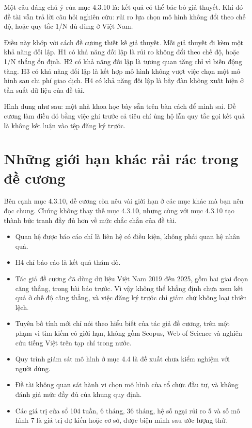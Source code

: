Một câu đáng chú ý của mục 4.3.10 là: kết quả có thể bác bỏ giả thuyết. Khi đó đề tài vẫn trả lời câu hỏi nghiên cứu: rủi ro lựa chọn mô hình không đổi theo chế độ, hoặc quy tắc 1/N đủ dùng ở Việt Nam.

Điều này khớp với cách đề cương thiết kế giả thuyết. Mỗi giả thuyết đi kèm một khả năng đối lập. H1 có khả năng đối lập là rủi ro không đổi theo chế độ, hoặc 1/N thắng ổn định. H2 có khả năng đối lập là tương quan tăng chỉ vì biến động tăng. H3 có khả năng đối lập là kết hợp mô hình không vượt việc chọn một mô hình sau chi phí giao dịch. H4 có khả năng đối lập là bầy đàn không xuất hiện ở tần suất dữ liệu của đề tài.

Hình dung như sau: một nhà khoa học bày sẵn trên bàn cách để mình sai. Đề cương làm điều đó bằng việc ghi trước cả tiêu chí ủng hộ lẫn quy tắc gọi kết quả là không kết luận vào tệp đăng ký trước.

\section{Những giới hạn khác rải rác trong đề cương}

Bên cạnh mục 4.3.10, đề cương còn nêu vài giới hạn ở các mục khác mà bạn nên đọc chung. Chúng không thay thế mục 4.3.10, nhưng cùng với mục 4.3.10 tạo thành bức tranh đầy đủ hơn về mức chắc chắn của đề tài.

\begin{itemize}
\item
  Quan hệ được báo cáo chỉ là liên hệ có điều kiện, không phải quan hệ nhân quả.
\item
  H4 chỉ báo cáo là kết quả thăm dò.
\item
  Tác giả đề cương đã dùng dữ liệu Việt Nam 2019 đến 2025, gồm hai giai đoạn căng thẳng, trong bài báo trước. Vì vậy không thể khẳng định chưa xem kết quả ở chế độ căng thẳng, và việc đăng ký trước chỉ giảm chứ không loại thiên lệch.
\item
  Tuyên bố tính mới chỉ nói theo hiểu biết của tác giả đề cương, trên một phạm vi tìm kiếm có giới hạn, không gồm Scopus, Web of Science và nghiên cứu tiếng Việt trên tạp chí trong nước.
\item
  Quy trình giám sát mô hình ở mục 4.4 là đề xuất chưa kiểm nghiệm với người dùng.
\item
  Đề tài không quan sát hành vi chọn mô hình của tổ chức đầu tư, và không đánh giá mức đầy đủ của khung quy định.
\item
  Các giá trị cửa sổ 104 tuần, 6 tháng, 36 tháng, hệ số ngại rủi ro 5 và số mô hình 7 là giá trị dự kiến hoặc cơ sở, được biện minh sau ước lượng thử.
\end{itemize}

